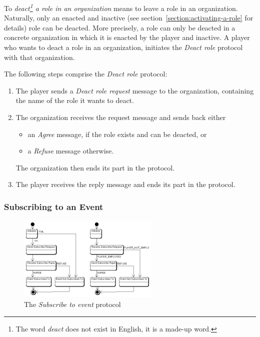 To \textit{deact\footnote{The word \textit{deact} does not exist in English, it is a made-up word.} a role in an organization} means to leave a role in an organization.
Naturally, only an enacted and inactive (see section~\ref{section:activating-a-role} for details) role can be deacted.
More precisely, a role can only be deacted in a concrete organization in which it is enacted by the player and inactive.
A player who wants to deact a role in an organization, initiates the \textit{Deact role} protocol with that organization.

The following steps comprise the \textit{Deact role} protocol:
\begin{enumerate}
	\item The player sends a \textit{Deact role request} message to the organization, containing the name of the role it wants to deact.
	\item The organization receives the request message and sends back either
	\begin{itemize}
		\item an \textit{Agree} message, if the role exists and can be deacted, or
		\item a \textit{Refuse} message otherwise.
	\end{itemize}
	The organization then ends its part in the protocol.
	\item The player receives the reply message and ends its part in the protocol.
\end{enumerate}

\subsubsection{Subscribing to an Event}

\begin{figure}[ht]
	\centering
	\includegraphics[width=0.6\textwidth]{images/thespian/subscribe-to-event-protocol.png}
	\caption{The \textit{Subscribe to event} protocol}
	\label{figure:thespian-subscribe-to-event-protocol}
\end{figure}

